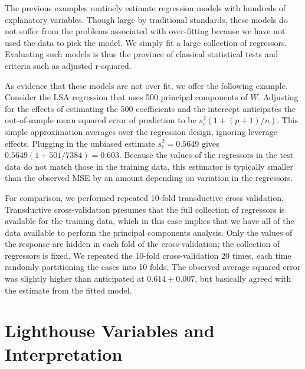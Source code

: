 \documentclass[12pt]{article}
\begin{document}
The previous examples routinely estimate regression models with hundreds of explanatory variables.  Though large by traditional standards, these models do not suffer from the problems associated with over-fitting because we have not used the data to pick the model.  We simply fit a large collection of regressors.  Evaluating such models is thus the province of classical statistical tests and criteria such as adjusted r-squared.  

As evidence that these models are not over fit, we offer the following example.  Consider the LSA regression that uses 500 principal components of $W$.  Adjusting for the effects of estimating the 500 coefficients and the intercept anticipates the out-of-sample mean squared error of prediction to be $s_e^2 (1+(p+1)/n)$.  This simple approximation averages over the regression design, ignoring leverage effects.  Plugging in the unbiased estimate $s_e^2 = 0.5649$ gives $0.5649 (1+501/7384) = 0.603$.  Because the values of the regressors in the test data do not match those in the training data, this estimator is typically smaller than the observed MSE by an amount depending on variation in the regressors.  

For comparison, we performed repeated 10-fold transductive cross validation.  Transductive cross-validation presumes that the full collection of regressors is available for the training data, which in this case implies that we have all of the data available to perform the principal components analysis.  Only the values of the response are hidden in each fold of the cross-validation; the collection of regressors is fixed.  We repeated the 10-fold cross-validation 20 times, each time randomly partitioning the cases into 10 folds. The observed average squared error was slightly higher than anticipated at $0.614 \pm 0.007$, but basically agreed with the estimate from the fitted model. 


\section{Lighthouse Variables and Interpretation}
\label{sec:light}
 
 
\end{document}
